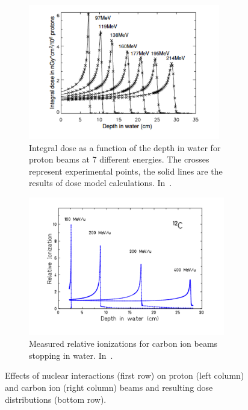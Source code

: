 \begin{figure}
\begin{subfigure}[t]{.49\textwidth}
\label{chap1::fig::nuclearReacLoss_Cion}
\end{subfigure}
\begin{subfigure}[t]{.49\textwidth}
\hspace{-0.6cm} \includegraphics[width=1.1\linewidth, height = 5.9cm]{03_GraphicFiles/chapter1_Introduction/tailBragg.pdf}	
\caption{Integral dose as a function of the depth in water for proton beams at 7 different energies. The crosses represent experimental points, the solid lines are the results of dose model calculations. In~\cite{Pedroni2005}.}
\label{chap1::fig::TailBragg_p}
\end{subfigure}
\begin{subfigure}[t]{.49\textwidth}
\includegraphics[width=1.2\linewidth, height = 6.05cm, trim = {1cm 0.4cm 0 0}, clip = true]{03_GraphicFiles/chapter1_Introduction/tailBragg_p.pdf}	
\caption{Measured relative ionizations for car\-bon ion beams stopping in water. In~\cite{Schardt2008}.}
\label{chap1::fig::TailBragg}
\end{subfigure}
\caption{Effects of nuclear interactions (first row) on proton (left column) and carbon ion (right column) beams and resulting dose distributions (bottom row).}
\label{chap1::fig::NuclearInt}
\end{figure}

